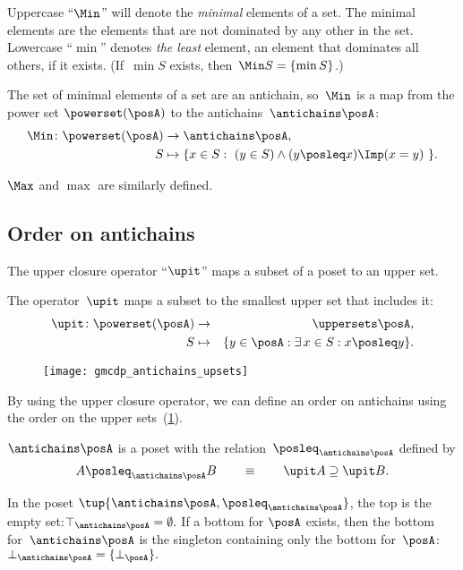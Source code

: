 


Uppercase ``$\Min$'' will denote the \emph{minimal} elements of
a set.
The minimal elements are the elements that are not dominated
by any other in the set.
Lowercase ``$\min$'' denotes\emph{ the
least} element, an element that dominates all others, if it exists.
(If~$\min S$ exists, then~$\Min S=\{\min S\}$.)

The set of minimal elements of a set are an antichain, so~$\Min$
is a map from the power set $\powerset(\posA)$ to the antichains~$\antichains\posA$:
\begin{align*}
    \Min\colon\powerset(\posA) & \rightarrow\antichains\posA,\\
    S & \mapsto\{x\in S:\ (y\in S)\wedge(y\posleq x)\Imp(x=y)\ \}.
\end{align*}

$\Max$ and $\max$ are similarly defined.

\subsection{Order on antichains}

The upper closure operator ``$\upit$'' maps a subset of a poset
to an upper set.
\begin{definition}
    The operator~$\upit$ maps a subset to the smallest upper set that
    includes it:
    \begin{eqnarray*}
        \upit\colon\powerset(\posA) & \rightarrow & \uppersets\posA,\\
        S & \mapsto & \{y\in\posA:\exists\,x\in S:x\posleq y\}.
    \end{eqnarray*}
\end{definition}

\begin{figure}[h]
    \centering
    \texttt{[image: gmcdp\_antichains\_upsets]}
    \caption{}
    \label{fig:antichains_upsets}
\end{figure}

By using the upper closure operator, we can define an order on antichains
using the order on the upper sets~(\cref{fig:antichains_upsets}).
\begin{lemma}
    \label{lem:antichains-are-poset}$\antichains\posA$ is a poset with
    the relation~$\posleq_{\antichains\posA}$ defined by
    \[
        A\posleq_{\antichains\posA}B\qquad\equiv\qquad\upit A\supseteq\upit B.
    \]
\end{lemma}
In the poset $\tup{\antichains\posA,\posleq_{\antichains\posA}}$,
the top is the empty set:$\top_{\antichains\posA}=\emptyset.$ If
a bottom for $\posA$ exists, then the bottom for~$\antichains\posA$
is the singleton containing only the bottom for~$\posA$: $\bot_{\antichains\posA}=\{\bot_{\posA}\}.$






